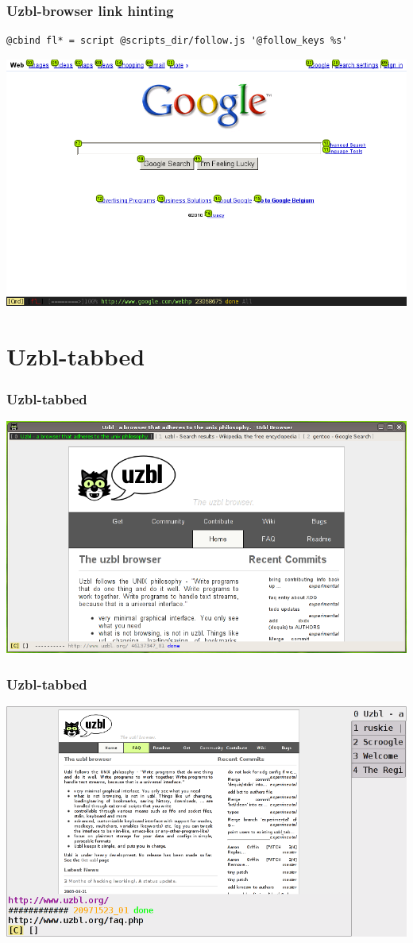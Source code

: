 \documentclass{beamer}
\begin{document}
\begin{frame}[fragile]
\frametitle{Uzbl-browser link hinting}
\begin{lstlisting}
@cbind fl* = script @scripts_dir/follow.js '@follow_keys %s'
\end{lstlisting}
\includegraphics[scale=0.4]{uzbl-browser-follower.png}
\end{frame}



\section{Uzbl-tabbed}
\frame
{
\frametitle{Uzbl-tabbed}
\includegraphics[scale=0.4]{uzbl-tabbed.png} %
}

\frame
{
\frametitle{Uzbl-tabbed}
\includegraphics[scale=0.4]{uzbl-tabbed2.png} %
}
\end{document}
